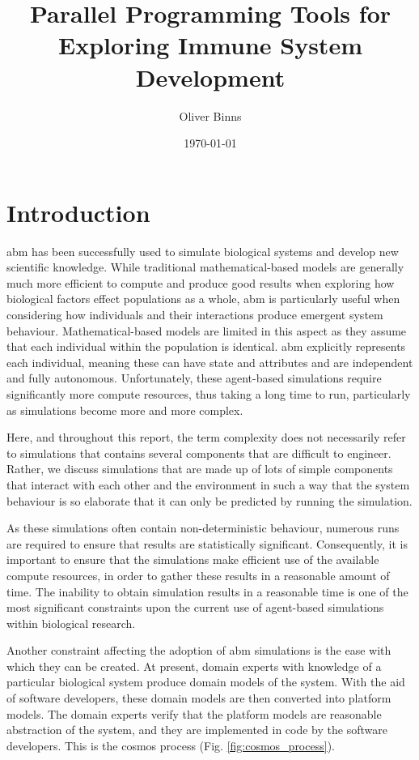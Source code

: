 \documentclass{UoYCSproject}
\title{Parallel Programming Tools for Exploring Immune System Development}
\author{Oliver Binns}
\date{\today}
\begin{document}
\maketitle
\listoffigures
\printglossary[type=\acronymtype]
\printglossary


\chapter{Introduction}
\gls{abm} has been successfully used to simulate biological systems and develop new scientific knowledge\cite{kieran_thesis, flame_keratinocyte}.
While traditional mathematical-based models are generally much more efficient to compute and produce good results when exploring how biological factors effect populations as a whole, \gls{abm} is particularly useful when considering how individuals and their interactions produce emergent system behaviour.
Mathematical-based models are limited in this aspect as they assume that each individual within the population is identical.
\gls{abm} explicitly represents each individual, meaning these can have state and attributes and are independent and fully autonomous.
Unfortunately, these agent-based simulations require significantly more compute resources, thus taking a long time to run, particularly as simulations become more and more complex.

Here, and throughout this report, the term complexity does not necessarily refer to simulations that contains several components that are difficult to engineer.
Rather, we discuss simulations that are made up of lots of simple components that interact with each other and the environment in such a way that the system behaviour is so elaborate that it can only be predicted by running the simulation.

As these simulations often contain non-deterministic behaviour, numerous runs are required to ensure that results are statistically significant.
Consequently, it is important to ensure that the simulations make efficient use of the available compute resources, in order to gather these results in a reasonable amount of time.
The inability to obtain simulation results in a reasonable time is one of the most significant constraints upon the current use of agent-based simulations within biological research.

Another constraint affecting the adoption of \gls{abm} simulations is the ease with which they can be created.
At present, domain experts with knowledge of a particular biological system produce domain models of the system.
With the aid of software developers, these domain models are then converted into platform models.
The domain experts verify that the platform models are reasonable abstraction of the system, and they are implemented in code by the software developers.
This is the \gls{cosmos} process (Fig. \ref{fig:cosmos_process}).
\label{cosmos_intro}
\end{document}
